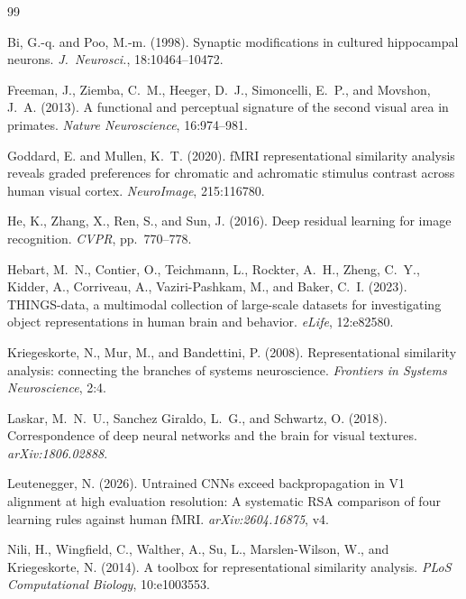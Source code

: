 \documentclass[10pt,twocolumn]{article}
\begin{document}

\begin{thebibliography}{99}

Bi, G.-q. and Poo, M.-m. (1998). Synaptic modifications in cultured hippocampal neurons. \textit{J.\ Neurosci.}, 18:10464--10472.

Freeman, J., Ziemba, C.~M., Heeger, D.~J., Simoncelli, E.~P., and Movshon, J.~A. (2013). A functional and perceptual signature of the second visual area in primates. \textit{Nature Neuroscience}, 16:974--981.

 Goddard, E. and Mullen, K.~T. (2020). fMRI representational similarity analysis reveals graded preferences for chromatic and achromatic stimulus contrast across human visual cortex. \textit{NeuroImage}, 215:116780.

He, K., Zhang, X., Ren, S., and Sun, J. (2016). Deep residual learning for image recognition. \textit{CVPR}, pp.~770--778.

Hebart, M.~N., Contier, O., Teichmann, L., Rockter, A.~H., Zheng, C.~Y., Kidder, A., Corriveau, A., Vaziri-Pashkam, M., and Baker, C.~I. (2023). THINGS-data, a multimodal collection of large-scale datasets for investigating object representations in human brain and behavior. \textit{eLife}, 12:e82580.

Kriegeskorte, N., Mur, M., and Bandettini, P. (2008). Representational similarity analysis: connecting the branches of systems neuroscience. \textit{Frontiers in Systems Neuroscience}, 2:4.

 Laskar, M.~N.~U., Sanchez Giraldo, L.~G., and Schwartz, O. (2018). Correspondence of deep neural networks and the brain for visual textures. \textit{arXiv:1806.02888}.

Leutenegger, N. (2026). Untrained CNNs exceed backpropagation in V1 alignment at high evaluation resolution: A systematic RSA comparison of four learning rules against human fMRI. \textit{arXiv:2604.16875}, v4.

Nili, H., Wingfield, C., Walther, A., Su, L., Marslen-Wilson, W., and Kriegeskorte, N. (2014). A toolbox for representational similarity analysis. \textit{PLoS Computational Biology}, 10:e1003553.


\end{thebibliography}
\end{document}
